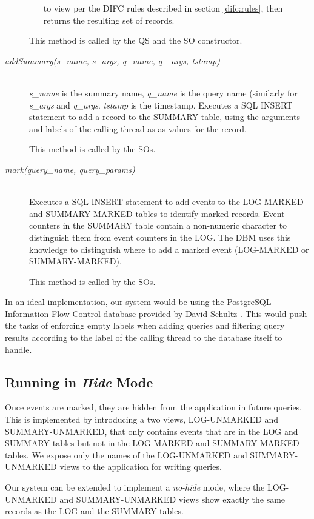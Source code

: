 \begin{description}
\begin{enumerate}
        to view per the DIFC rules described in section
        \ref{difc:rules}, then returns the resulting
        set of records.
    \end{enumerate}
    This method is called by the QS and the SO constructor.
  \item[\emph{addSummary(s\_name, 
      s\_args, q\_name, q\_ args, tstamp)}] \ \\
    \emph{s\_name} is the summary name, \emph{q\_name}
    is the query name (similarly for \emph{s\_args} and
    \emph{q\_args}. \emph{tstamp} is the timestamp.
    Executes a SQL INSERT statement to add a record to
    the SUMMARY table, using the arguments and labels
    of the calling thread as as values for the record.
    
    This method is called by the SOs.
  \item[\emph{mark(query\_name, query\_params)}] \ \\
    Executes a SQL INSERT statement to add events
    to the LOG-MARKED and SUMMARY-MARKED tables to
    identify marked records.
    Event counters in the SUMMARY table contain
    a non-numeric character to distinguish them from
    event counters in the LOG. The DBM uses 
    this knowledge to distinguish
    where to add a marked event (LOG-MARKED or 
    SUMMARY-MARKED).
    
    This method is called by the SOs.
\end{description}

In an ideal implementation, our system would be using the PostgreSQL Information Flow Control database provided by David Schultz \cite{das}. This would push the tasks of enforcing empty labels when adding queries and filtering query results according to the label of the calling thread to the database itself to handle.

\subsection{Running in \emph{Hide} Mode}

Once events are marked, they are hidden from the application in future queries. This is implemented by introducing a two views, LOG-UNMARKED and SUMMARY-UNMARKED, that only contains events that are in the LOG and SUMMARY tables but not in the LOG-MARKED and SUMMARY-MARKED tables. We expose only the names of the LOG-UNMARKED and SUMMARY-UNMARKED views to the application for writing queries.

Our system can be extended to implement a \emph{no-hide} mode, where the LOG-UNMARKED and SUMMARY-UNMARKED views show exactly the same records as the LOG and the SUMMARY tables.
